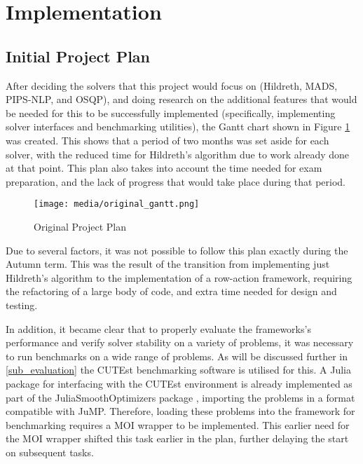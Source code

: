 \section{Implementation}\label{sec_implementation}
\subsection{Initial Project Plan}
After deciding the solvers that this project would focus on (Hildreth, MADS, PIPS-NLP, and OSQP), and doing research on the additional features that would be needed for this to be successfully implemented (specifically, implementing solver interfaces and benchmarking utilities), the Gantt chart shown in Figure \ref{fig:original_gantt} was created. This shows that a period of two months was set aside for each solver, with the reduced time for Hildreth's algorithm due to work already done at that point. This plan also takes into account the time needed for exam preparation, and the lack of progress that would take place during that period. 

\begin{figure}[h]
    \centering
    \texttt{[image: media/original\_gantt.png]}
    \caption{Original Project Plan}
    \label{fig:original_gantt}
\end{figure}

Due to several factors, it was not possible to follow this plan exactly during the Autumn term. This was the result of the transition from implementing just Hildreth's algorithm to the implementation of a row-action framework, requiring the refactoring of a large body of code, and extra time needed for design and testing.

In addition, it became clear that to properly evaluate the frameworks's performance and verify solver stability on a variety of problems, it was necessary to run benchmarks on a wide range of problems. As will be discussed further in \ref{sub_evaluation} the CUTEst benchmarking software \cite{Gould2013CUTEst:Threads} is utilised for this. A Julia package for interfacing with the CUTEst environment is already implemented as part of the JuliaSmoothOptimizers package \cite{JuliaSmoothOptimizers/CUTEst.jl:Interface}, importing the problems in a format compatible with JuMP. Therefore, loading these problems into the framework for benchmarking requires a MOI wrapper to be implemented. This earlier need for the MOI wrapper shifted this task earlier in the plan, further delaying the start on subsequent tasks. 

